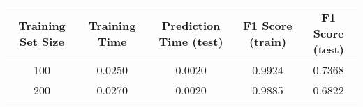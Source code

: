 \documentclass[11pt]{article}
\begin{document}
\begin{longtable}[]{@{}ccccc@{}}
\toprule
\begin{minipage}[b]{0.16\columnwidth}\centering\strut
Training Set Size\strut
\end{minipage} & \begin{minipage}[b]{0.21\columnwidth}\centering\strut
Training Time\strut
\end{minipage} & \begin{minipage}[b]{0.20\columnwidth}\centering\strut
Prediction Time (test)\strut
\end{minipage} & \begin{minipage}[b]{0.15\columnwidth}\centering\strut
F1 Score (train)\strut
\end{minipage} & \begin{minipage}[b]{0.14\columnwidth}\centering\strut
F1 Score (test)\strut
\end{minipage}\tabularnewline
\midrule
\endhead
\begin{minipage}[t]{0.16\columnwidth}\centering\strut
100\strut
\end{minipage} & \begin{minipage}[t]{0.21\columnwidth}\centering\strut
0.0250\strut
\end{minipage} & \begin{minipage}[t]{0.20\columnwidth}\centering\strut
0.0020\strut
\end{minipage} & \begin{minipage}[t]{0.15\columnwidth}\centering\strut
0.9924\strut
\end{minipage} & \begin{minipage}[t]{0.14\columnwidth}\centering\strut
0.7368\strut
\end{minipage}\tabularnewline
\begin{minipage}[t]{0.16\columnwidth}\centering\strut
200\strut
\end{minipage} & \begin{minipage}[t]{0.21\columnwidth}\centering\strut
0.0270\strut
\end{minipage} & \begin{minipage}[t]{0.20\columnwidth}\centering\strut
0.0020\strut
\end{minipage} & \begin{minipage}[t]{0.15\columnwidth}\centering\strut
0.9885\strut
\end{minipage} & \begin{minipage}[t]{0.14\columnwidth}\centering\strut
0.6822\strut
\end{minipage}\tabularnewline

\end{longtable}
\end{document}
